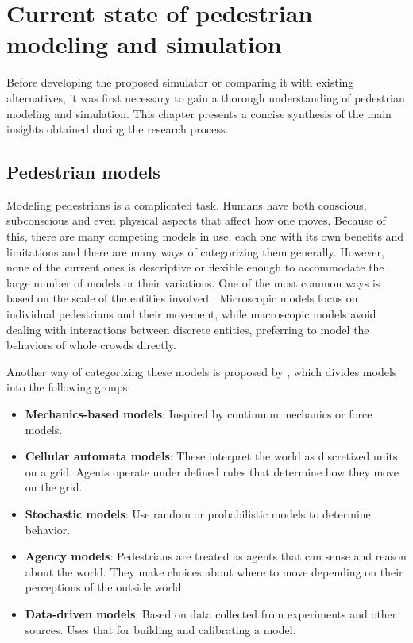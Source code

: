 \documentclass[twoside, 11pt]{article}
\begin{document}
\section{Current state of pedestrian modeling and simulation} \label{sec:overview}

Before developing the proposed simulator or comparing it with existing alternatives, it was first necessary to gain a thorough understanding of pedestrian modeling and simulation. This chapter presents a concise synthesis of the main insights obtained during the research process.

\subsection{Pedestrian models}

Modeling pedestrians is a complicated task. Humans have both conscious, subconscious and even physical aspects that affect how one moves. Because of this, there are many competing models in use, each one with its own benefits and limitations and there are many ways of categorizing them generally. However, none of the current ones is descriptive or flexible enough to accommodate the large number of models or their variations. One of the most common ways is based on the scale of the entities involved \cite{kleinmeierVadereOpenSourceSimulation2019}. Microscopic models focus on individual pedestrians and their movement, while macroscopic models avoid dealing with interactions between discrete entities, preferring to model the behaviors of whole crowds directly.

Another way of categorizing these models is proposed by \cite{martinez-gilModelingEvaluationScale2017}, which divides models into the following groups:

\begin{itemize}
  \item \textbf{Mechanics-based models}: Inspired by continuum mechanics or force models.
  \item \textbf{Cellular automata models}: These interpret the world as discretized units on a grid. Agents operate under defined rules that determine how they move on the grid.
  \item \textbf{Stochastic models}: Use random or probabilistic models to determine behavior.
  \item \textbf{Agency models}: Pedestrians are treated as agents that can sense and reason about the world. They make choices about where to move depending on their perceptions of the outside world.
  \item \textbf{Data-driven models}: Based on data collected from experiments and other sources. Uses that for building and calibrating a model.
\end{itemize}
\end{document}

